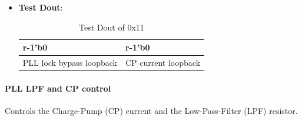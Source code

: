 \documentclass[main\_\_EN.tex]{subfiles}
\begin{document}
\begin{itemize}
\begin{itemize}
        \end{itemize}
    \item \textbf{Test Dout}:
        \begin{longtable}{ |p{6cm}|p{6cm}|}
            \caption{Test Dout of 0x11}
            \label{tab:test-dout-0x11} \\
            \hline
            \rowcolor{lightgray}
            \textbf{r-1'b0} & \textbf{r-1'b0} \\ \hline
            PLL lock bypass loopback & CP current loopback \\ \hline
        \end{longtable}
\end{itemize}

\paragraph{PLL LPF and CP control}
\label{sec:test-code-0x12}
Controls the Charge-Pump (CP) current and the Low-Pass-Filter (LPF) resistor.
\end{document}
